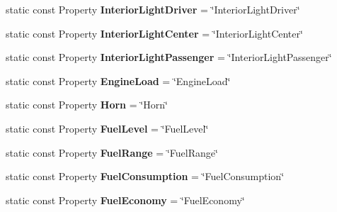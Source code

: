 \begin{DoxyCompactItemize}
\item 
\hypertarget{classVehicleProperty_a16b99ec2210fd4ca509a00e59b80f8c0}{static const Property {\bfseries Interior\-Light\-Driver} = \char`\"{}Interior\-Light\-Driver\char`\"{}}\label{classVehicleProperty_a16b99ec2210fd4ca509a00e59b80f8c0}

\item 
\hypertarget{classVehicleProperty_a86c0bb4ab676e06e3c807d90c92e7240}{static const Property {\bfseries Interior\-Light\-Center} = \char`\"{}Interior\-Light\-Center\char`\"{}}\label{classVehicleProperty_a86c0bb4ab676e06e3c807d90c92e7240}

\item 
\hypertarget{classVehicleProperty_af60682429c3b2c7517715801d4ac0f92}{static const Property {\bfseries Interior\-Light\-Passenger} = \char`\"{}Interior\-Light\-Passenger\char`\"{}}\label{classVehicleProperty_af60682429c3b2c7517715801d4ac0f92}

\item 
\hypertarget{classVehicleProperty_a89cb1e6e8dcb7910270c333d79200665}{static const Property {\bfseries Engine\-Load} = \char`\"{}Engine\-Load\char`\"{}}\label{classVehicleProperty_a89cb1e6e8dcb7910270c333d79200665}

\item 
\hypertarget{classVehicleProperty_a69370e86d3520734d83a4c154b533642}{static const Property {\bfseries Horn} = \char`\"{}Horn\char`\"{}}\label{classVehicleProperty_a69370e86d3520734d83a4c154b533642}

\item 
\hypertarget{classVehicleProperty_a9bfbe5beb9e13c8de62c7514b3b22fc9}{static const Property {\bfseries Fuel\-Level} = \char`\"{}Fuel\-Level\char`\"{}}\label{classVehicleProperty_a9bfbe5beb9e13c8de62c7514b3b22fc9}

\item 
\hypertarget{classVehicleProperty_ae0c98c8cbfb6b8553faabfb9d4a42b35}{static const Property {\bfseries Fuel\-Range} = \char`\"{}Fuel\-Range\char`\"{}}\label{classVehicleProperty_ae0c98c8cbfb6b8553faabfb9d4a42b35}

\item 
\hypertarget{classVehicleProperty_afdc1b7b9ecf211d26221b155aef9a35a}{static const Property {\bfseries Fuel\-Consumption} = \char`\"{}Fuel\-Consumption\char`\"{}}\label{classVehicleProperty_afdc1b7b9ecf211d26221b155aef9a35a}

\item 
\hypertarget{classVehicleProperty_af34bb142d87eb300ce82e112598d5376}{static const Property {\bfseries Fuel\-Economy} = \char`\"{}Fuel\-Economy\char`\"{}}\label{classVehicleProperty_af34bb142d87eb300ce82e112598d5376}


\end{DoxyCompactItemize}
